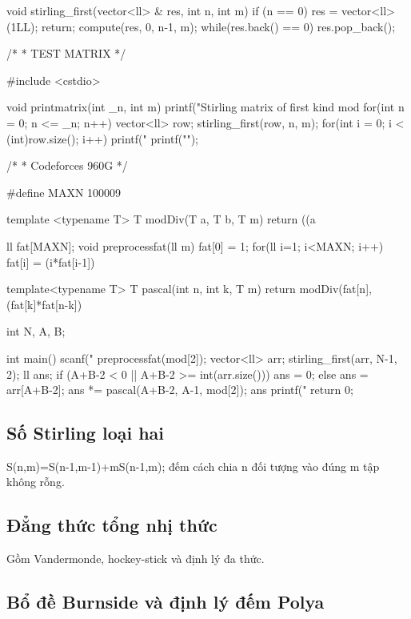 \documentclass[11pt]{article}
\begin{document}
\begin{vncode}
void stirling_first(vector<ll> & res, int n, int m) {
	if (n == 0) {
		res = vector<ll>({1LL});
		return;
	}
	compute(res, 0, n-1, m);
	while(res.back() == 0) res.pop_back();
}

/*
 * TEST MATRIX
 */

#include <cstdio>

void printmatrix(int _n, int m) {
	printf("Stirling matrix of first kind mod %
	for(int n = 0; n <= _n; n++) {
		vector<ll> row;
		stirling_first(row, n, m);
		for(int i = 0; i < (int)row.size(); i++) {
			printf("%
		}
		printf("\n");
	}
}

/*
 * Codeforces 960G
 */

#define MAXN 100009
 
template <typename T>
T modDiv(T a, T b, T m) {
    return ((a %
}

ll fat[MAXN];
void preprocessfat(ll m) {
    fat[0] = 1;
    for(ll i=1; i<MAXN; i++) {
        fat[i] = (i*fat[i-1])%
    }
}

template<typename T>
T pascal(int n, int k, T m) {
    return modDiv(fat[n], (fat[k]*fat[n-k])%
}

int N, A, B;

int main() {
	scanf("%
	preprocessfat(mod[2]);
	vector<ll> arr;
	stirling_first(arr, N-1, 2);
	ll ans;
	if (A+B-2 < 0 || A+B-2 >= int(arr.size())) {
		ans = 0;
	}
	else {
		ans = arr[A+B-2];
		ans *= pascal(A+B-2, A-1, mod[2]);
		ans %
	}
	printf("%
	return 0;
}
\end{vncode}
\endgroup


\subsection{Số Stirling loại hai}

S(n,m)=S(n-1,m-1)+mS(n-1,m); đếm cách chia n đối tượng vào đúng m tập không rỗng.



\subsection{Đẳng thức tổng nhị thức}

Gồm Vandermonde, hockey-stick và định lý đa thức.

\subsection{Bổ đề Burnside và định lý đếm Polya}
\end{document}
